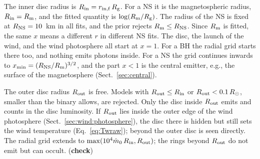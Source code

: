 The inner disc radius is $R_{\rm in} = r_{\rm in,f}\,R_{\rm g}$.
For a NS it is the magnetospheric radius, $R_{\rm in} = R_{\rm m}$, and the fitted quantity is $\log(R_{\rm m}/R_{\rm g})$.
The radius of the NS is fixed at $R_{\rm NS} = 10$~km in all fits, and the prior rejects $R_{\rm m} \le R_{\rm NS}$.
Since $R_{\rm m}$ is fitted, the same $x$ means a different $r$ in different NS fits.
The disc, the launch of the wind, %
and the wind photosphere all start at $x = 1$.
For a BH the radial grid starts there too, and nothing emits photons inside.
For a NS the grid continues inwards to $x_{\rm min} = (R_{\rm NS}/R_{\rm m})^{3/2}$, and the part $x < 1$ is the central emitter, e.g., the surface of the magnetosphere (Sect.~\ref{sec:central}).

The outer disc radius $R_{\rm out}$ is free.
Models with $R_{\rm out} \le R_{\rm in}$ or $R_{\rm out} < 0.1\,R_\odot$, smaller than the binary allows, are rejected.
Only the disc inside $R_{\rm out}$ emits and counts in the disc luminosity.
If $R_{\rm out}$ lies inside the {outer edge of the wind photosphere} (Sect.~\ref{sec:wind:photosphere}), the disc there is hidden but still sets the wind temperature (Eq.~\ref{eq:Twraw}); beyond  the outer disc is seen directly.
The radial grid extends to $\max(10^4\dot m_0\,R_{\rm in}, R_{\rm out})$; the rings beyond $R_{\rm out}$ do not emit but can occult. (\textbf{check})

